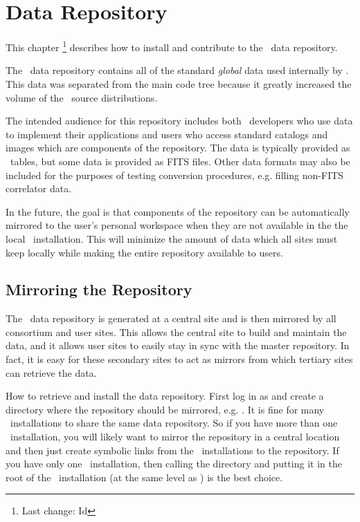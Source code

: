 \chapter{Data Repository}
\label{data repository}
\label{Data Repository}

This chapter \footnote{Last change:
$ $Id$ $}
describes how to install and contribute to the \aipspp\ data repository.

The \aipspp\ data repository contains all of the standard \textit{global}
data used internally by \aipspp. This data was separated from the main code tree
because it greatly increased the volume of the \aipspp\ source distributions.

The intended audience for this repository includes both \aipspp\ developers
who use data to implement their applications and users who access standard
catalogs and images which are components of the repository. The data is
typically provided as \aipspp\ tables, but some data is provided as FITS
files. Other data formats may also be included for the purposes of testing
conversion procedures, e.g. filling non-FITS correlator data.

In the future, the goal is that components of the repository can be
automatically mirrored to the user's personal workspace when they are not
available in the the local \aipspp\ installation. This will minimize the
amount of data which all sites must keep locally while making the entire
repository available to users.


\section{Mirroring the Repository}
\label{data repository mirroring}

The \aipspp\ data repository is generated at a central site and is then
mirrored by all consortium and user sites. This allows the central site
to build and maintain the data, and it allows user sites to easily stay
in sync with the master repository. In fact, it is easy for these secondary
sites to act as mirrors from which tertiary sites can retrieve the data.

How to retrieve and install the data repository. First log in as 
and create a directory where the repository should be mirrored, e.g. .
It is fine for many \aipspp\ installations to share the same data repository. So if
you have more than one \aipspp\ installation, you will likely want to mirror the
repository in a central location and then just create symbolic links from the
\aipspp\ installations to the repository. If you have only one \aipspp\ installation,
then calling the directory  and putting it in the root of the
\aipspp\ installation (at the same level as ) is the best choice.



